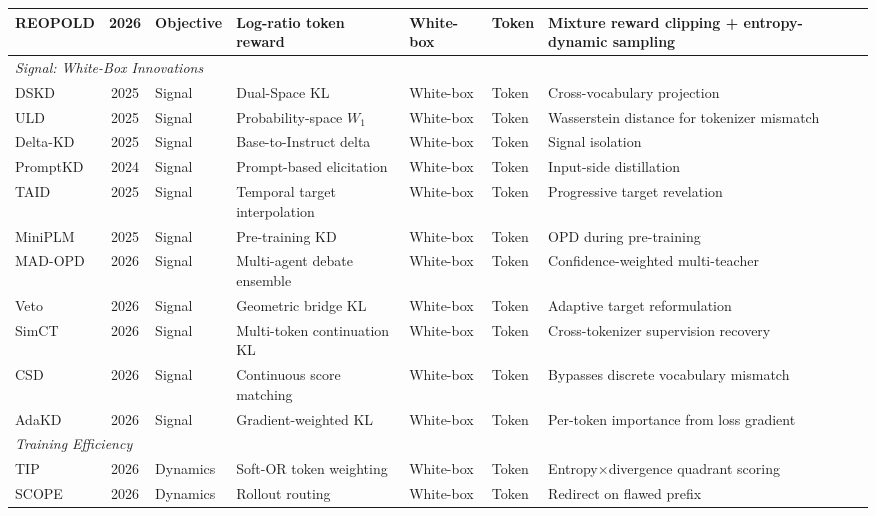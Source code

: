 \documentclass{article} %
\begin{document}
\begin{table}[t]
{\begin{tabular}{@{}lclllll@{}}
        REOPOLD \citep{2603.11137} & 2026 & Objective & Log-ratio token reward & White-box & Token & Mixture reward clipping + entropy-dynamic sampling \\
        \midrule
        \multicolumn{7}{l}{\textit{Signal: White-Box Innovations}} \\
        \midrule
        DSKD \citep{2504.11426} & 2025 & Signal & Dual-Space KL & White-box & Token & Cross-vocabulary projection \\
        ULD \citep{2402.12030} & 2025 & Signal & Probability-space $W_1$ & White-box & Token & Wasserstein distance for tokenizer mismatch \\
        Delta-KD \citep{2509.14526} & 2025 & Signal & Base-to-Instruct delta & White-box & Token & Signal isolation \\
        PromptKD \citep{2402.12842} & 2024 & Signal & Prompt-based elicitation & White-box & Token & Input-side distillation \\
        TAID \citep{2501.16937} & 2025 & Signal & Temporal target interpolation & White-box & Token & Progressive target revelation \\
        MiniPLM \citep{2410.17215} & 2025 & Signal & Pre-training KD & White-box & Token & OPD during pre-training \\
        MAD-OPD \citep{wang2026madopd} & 2026 & Signal & Multi-agent debate ensemble & White-box & Token & Confidence-weighted multi-teacher \\
        Veto \citep{2601.07155} & 2026 & Signal & Geometric bridge KL & White-box & Token & Adaptive target reformulation \\
        SimCT \citep{sun2026simct} & 2026 & Signal & Multi-token continuation KL & White-box & Token & Cross-tokenizer supervision recovery \\
        CSD \citep{2509.25837} & 2026 & Signal & Continuous score matching & White-box & Token & Bypasses discrete vocabulary mismatch \\
        AdaKD \citep{2510.11615} & 2026 & Signal & Gradient-weighted KL & White-box & Token & Per-token importance from loss gradient \\
        \midrule
        \multicolumn{7}{l}{\textit{Training Efficiency}} \\
        \midrule
        TIP \citep{xu2026tip} & 2026 & Dynamics & Soft-OR token weighting & White-box & Token & Entropy$\times$divergence quadrant scoring \\
        SCOPE \citep{zheng2026scope} & 2026 & Dynamics & Rollout routing & White-box & Token & Redirect on flawed prefix \\

\end{tabular}}
\end{table}
\end{document}
